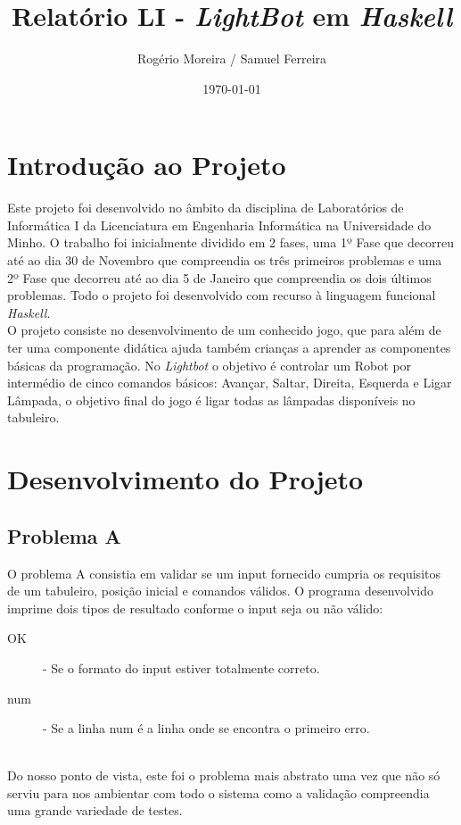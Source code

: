\documentclass[a4paper,12pt,portuges]{article}
\title {Relatório LI - \textit{LightBot} em \textit{Haskell}}
\author{Rogério Moreira / Samuel Ferreira}
\date {\today}
\begin{document}
\maketitle

\section {Introdução ao Projeto}

Este projeto foi desenvolvido no âmbito da disciplina de Laboratórios de Informática I da Licenciatura em Engenharia Informática na Universidade do Minho. O trabalho foi inicialmente dividido em 2 fases, uma 1º Fase que decorreu até ao dia 30 de Novembro que compreendia os três primeiros problemas e uma 2º Fase que decorreu até ao dia 5 de Janeiro que compreendia os dois últimos problemas. Todo o projeto foi desenvolvido com recurso à linguagem funcional \textit{Haskell}.\\
O projeto consiste no desenvolvimento de um conhecido jogo, que para além de ter uma componente didática ajuda também crianças a aprender as componentes básicas da programação. No \textit{Lightbot} o objetivo é controlar um Robot por intermédio de cinco comandos básicos: Avançar, Saltar, Direita, Esquerda e Ligar Lâmpada, o objetivo final do jogo é ligar todas as lâmpadas disponíveis no tabuleiro.

\section {Desenvolvimento do Projeto}

\subsection {Problema A}

O problema A consistia em validar se um input fornecido cumpria os requisitos de um tabuleiro, posição inicial e comandos válidos. O programa desenvolvido imprime dois tipos de resultado conforme o input seja ou não válido:\\

\begin{description}
\item[OK] - Se o formato do input estiver totalmente correto.\\
\item[num]- Se a linha num é a linha onde se encontra o primeiro erro.
\end{description}
\\
Do nosso ponto de vista, este foi o problema mais abstrato uma vez que não só serviu para nos ambientar com todo o sistema como a validação compreendia uma grande variedade de testes.
\end{document}

